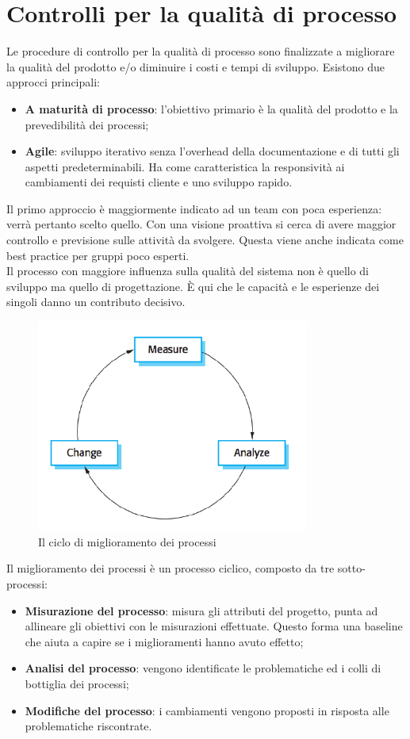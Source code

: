 \section{Controlli per la qualità di processo}
Le procedure di controllo per la qualità di processo sono finalizzate a migliorare la qualità del prodotto e/o diminuire i costi e tempi di sviluppo. Esistono due approcci principali:
\begin{itemize}
\item \textbf{A maturità di processo}: l'obiettivo primario è la qualità del prodotto e la prevedibilità dei processi;
\item \textbf{Agile}: sviluppo iterativo senza l'overhead della documentazione e di tutti gli aspetti predeterminabili. Ha come caratteristica la responsività ai cambiamenti dei requisti cliente e uno sviluppo rapido.
\end{itemize}
Il primo approccio è maggiormente indicato ad un team con poca esperienza: verrà pertanto scelto quello. Con una visione proattiva si cerca di avere maggior controllo e previsione sulle attività da svolgere. Questa viene anche indicata come best practice per gruppi poco esperti.\\
Il processo con maggiore influenza sulla qualità del sistema non è quello di sviluppo ma quello di progettazione. È qui che le capacità e le esperienze dei singoli danno un contributo decisivo.\\
\begin{figure}[h]
\centering \includegraphics[width=0.8\textwidth]{res/sections/processImprovement.png}
\caption{Il ciclo di miglioramento dei processi}
\end{figure}
Il miglioramento dei processi è un processo ciclico, composto da tre sotto-processi:
\begin{itemize}
\item \textbf{Misurazione del processo}: misura gli attributi del progetto, punta ad allineare gli obiettivi con le misurazioni effettuate. Questo forma una baseline che aiuta a capire se i miglioramenti hanno avuto effetto;
\item \textbf{Analisi del processo}: vengono identificate le problematiche ed i colli di bottiglia dei processi;
\item \textbf{Modifiche del processo}: i cambiamenti vengono proposti in risposta alle problematiche riscontrate.
\end{itemize}
